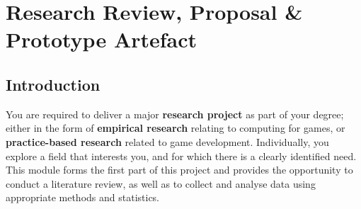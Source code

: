 \chapter{Research Review, Proposal \& Prototype Artefact}

\section*{Introduction}

You are required to deliver a major \textbf{research project} as part of your degree; either in the form of \textbf{empirical research} relating to computing for games, or \textbf{practice-based research} related to game development. Individually, you explore a field that interests you, and for which there is a clearly identified need. This module forms the first part of this project and provides the opportunity to conduct a literature review, as well as to collect and analyse data using appropriate methods and statistics.

